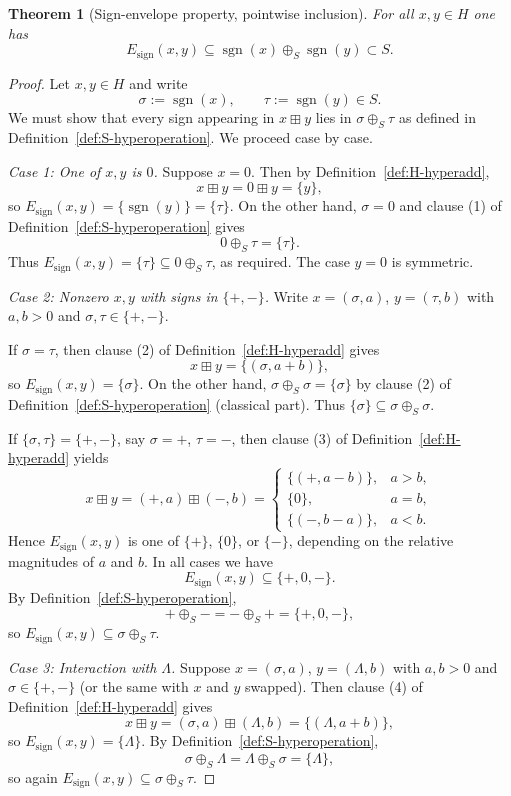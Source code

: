 \documentclass[11pt]{amsart}
\numberwithin{equation}{section}
\newtheorem{theorem}{Theorem}[section]
\theoremstyle{definition}
\theoremstyle{remark}
\newcommand{\Hnum}{H}                      %
\newcommand{\Sset}{S}                      %
\newcommand{\sgn}{\operatorname{sgn}}
\newcommand{\op}{\boxplus}                 %
\newcommand{\sop}{\oplus_S}                %
\begin{document}
\begin{theorem}[Sign-envelope property, pointwise inclusion]
\label{thm:sign-envelope-inclusion}
For all $x,y\in\Hnum$ one has
\[
  E_{\mathrm{sign}}(x,y)
  \subseteq \sgn(x)\sop\sgn(y)\subset\Sset.
\]
\end{theorem}

\begin{proof}
Let $x,y\in\Hnum$ and write
\[
  \sigma := \sgn(x),\qquad
  \tau := \sgn(y)\in\Sset.
\]
We must show that every sign appearing in $x\op y$ lies in
$\sigma\sop\tau$ as defined in
Definition~\ref{def:S-hyperoperation}.  We proceed case by case.

\smallskip\noindent
\emph{Case 1: One of $x,y$ is $0$.}  Suppose $x=0$.  Then by
Definition~\ref{def:H-hyperadd},
\[
  x\op y = 0\op y = \{y\},
\]
so $E_{\mathrm{sign}}(x,y)=\{\sgn(y)\}=\{\tau\}$.  On the other hand,
$\sigma=0$ and clause (1) of
Definition~\ref{def:S-hyperoperation} gives
\[
  0\sop\tau = \{\tau\}.
\]
Thus $E_{\mathrm{sign}}(x,y)=\{\tau\}\subseteq 0\sop\tau$, as
required.  The case $y=0$ is symmetric.

\smallskip\noindent
\emph{Case 2: Nonzero $x,y$ with signs in $\{+,-\}$.}  Write
$x=(\sigma,a)$, $y=(\tau,b)$ with $a,b>0$ and
$\sigma,\tau\in\{+,-\}$.

If $\sigma=\tau$, then clause (2) of
Definition~\ref{def:H-hyperadd} gives
\[
  x\op y = \{(\sigma,a+b)\},
\]
so $E_{\mathrm{sign}}(x,y)=\{\sigma\}$.  On the other hand,
$\sigma\sop\sigma=\{\sigma\}$ by clause (2) of
Definition~\ref{def:S-hyperoperation} (classical part).  Thus
$\{\sigma\}\subseteq\sigma\sop\sigma$.

If $\{\sigma,\tau\}=\{+,-\}$, say $\sigma=+$, $\tau=-$, then clause
(3) of Definition~\ref{def:H-hyperadd} yields
\[
  x\op y
  = (+,a)\op(-,b)
  =
  \begin{cases}
    \{(+,a-b)\}, & a>b,\\[2pt]
    \{0\},       & a=b,\\[2pt]
    \{(-,b-a)\}, & a<b.
  \end{cases}
\]
Hence $E_{\mathrm{sign}}(x,y)$ is one of $\{+\}$, $\{0\}$, or
$\{-\}$, depending on the relative magnitudes of $a$ and $b$.  In all
cases we have
\[
  E_{\mathrm{sign}}(x,y)\subseteq\{+,0,-\}.
\]
By Definition~\ref{def:S-hyperoperation},
\[
  +\sop- = -\sop+ = \{+,0,-\},
\]
so $E_{\mathrm{sign}}(x,y)\subseteq\sigma\sop\tau$.

\smallskip\noindent
\emph{Case 3: Interaction with $\Lambda$.}  Suppose
$x=(\sigma,a)$, $y=(\Lambda,b)$ with $a,b>0$ and
$\sigma\in\{+,-\}$ (or the same with $x$ and $y$ swapped).  Then
clause (4) of Definition~\ref{def:H-hyperadd} gives
\[
  x\op y
  = (\sigma,a)\op(\Lambda,b)
  = \{(\Lambda,a+b)\},
\]
so $E_{\mathrm{sign}}(x,y)=\{\Lambda\}$.  By
Definition~\ref{def:S-hyperoperation},
\[
  \sigma\sop\Lambda = \Lambda\sop\sigma = \{\Lambda\},
\]
so again $E_{\mathrm{sign}}(x,y)\subseteq\sigma\sop\tau$.


\end{proof}
\end{document}

